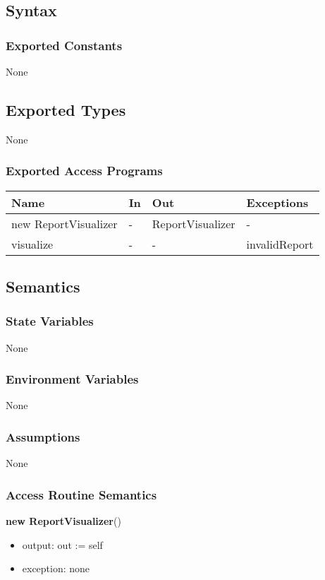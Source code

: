 \documentclass[12pt, titlepage]{article}
\begin{document}
\subsection{Syntax}

\subsubsection{Exported Constants}
None
\subsection{Exported Types}
None

\subsubsection{Exported Access Programs}
\begin{center}
\begin{tabular}{p{5cm} p{2cm} p{4cm} p{5.5cm}}
\hline
\textbf{Name} & \textbf{In} & \textbf{Out} & \textbf{Exceptions} \\
\hline
new ReportVisualizer & - & ReportVisualizer & - \\
\hline
visualize & - & - & invalidReport \\
\hline
\end{tabular}
\end{center}

\subsection{Semantics}

\subsubsection{State Variables}
None
\subsubsection{Environment Variables}
None
\subsubsection{Assumptions}
None
\subsubsection{Access Routine Semantics}

\noindent \textbf{new ReportVisualizer}()
\begin{itemize}
\item output: out := self
\item exception: none
\end{itemize}
\end{document}
